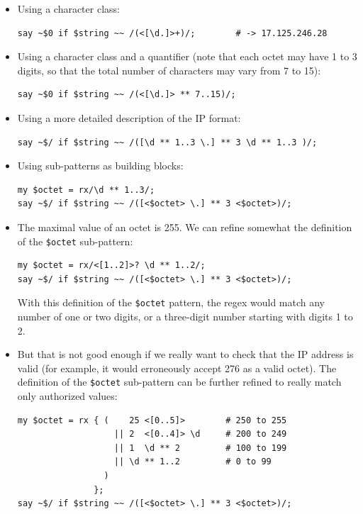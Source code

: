 \begin{itemize} 	

\item Using a character class:

\begin{verbatim}
say ~$0 if $string ~~ /(<[\d.]>+)/;        # -> 17.125.246.28
\end{verbatim}
%

\item Using a character class and a quantifier (note that 
each octet may have 1 to 3 digits, so that the total number 
of characters may vary from 7 to 15):

\begin{verbatim}
say ~$0 if $string ~~ /(<[\d.]> ** 7..15)/;  
\end{verbatim}
%

\item Using a more detailed description of the IP format:
\begin{verbatim}
say ~$/ if $string ~~ /([\d ** 1..3 \.] ** 3 \d ** 1..3 )/;
\end{verbatim}
%

\item Using sub-patterns as building blocks:
\begin{verbatim}
my $octet = rx/\d ** 1..3/;
say ~$/ if $string ~~ /([<$octet> \.] ** 3 <$octet>)/;
\end{verbatim}
%

\item The maximal value of an octet is 255. We can 
refine somewhat the definition of the \verb'$octet' 
sub-pattern:
\begin{verbatim}
my $octet = rx/<[1..2]>? \d ** 1..2/;
say ~$/ if $string ~~ /([<$octet> \.] ** 3 <$octet>)/;
\end{verbatim}
%
With this definition of the \verb'$octet' pattern, the 
regex would match any number of one or two digits, or a 
three-digit number starting with digits 1 to 2.

\item But that is not good enough if we really want to check 
that the IP address is valid (for example, it would erroneously 
accept 276 as a valid octet). The definition of the 
\verb'$octet' sub-pattern can be further refined to 
really match only authorized values:

\begin{verbatim}
my $octet = rx { (    25 <[0..5]>        # 250 to 255
                   || 2  <[0..4]> \d     # 200 to 249
                   || 1  \d ** 2         # 100 to 199
                   || \d ** 1..2         # 0 to 99 
                 )
               };
say ~$/ if $string ~~ /([<$octet> \.] ** 3 <$octet>)/;
\end{verbatim}
%


\end{itemize}
